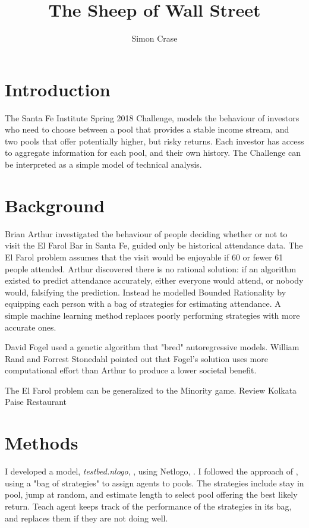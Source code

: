 \documentclass[]{article}
\title{The Sheep of Wall Street}
\author{Simon Crase}
\begin{document}
\maketitle

\begin{abstract}

\end{abstract}

\section{Introduction}
The Santa Fe Institute Spring 2018 Challenge\cite{Challenge:2018}, models the behaviour of investors who need to choose between a pool that provides a stable income stream, and two pools that offer potentially higher, but risky returns. Each investor has access to aggregate information for each pool, and their own history. The Challenge can be interpreted as a simple model of technical analysis\cite{wiki:technical}.

\section{Background}
Brian Arthur \cite{arthur1994inductive} investigated the behaviour of people deciding whether or not to visit the El Farol Bar in Santa Fe, guided only be historical attendance data. The El Farol problem assumes that the visit would be enjoyable if 60 or fewer 61 people attended. Arthur discovered there is no rational solution: if an algorithm existed to predict attendance accurately, either everyone would attend, or nobody would, falsifying the prediction. Instead he modelled Bounded Rationality by equipping each person with a bag of strategies for estimating attendance. A simple machine learning method replaces poorly performing strategies with more accurate ones.


David Fogel \cite{fogel1999inductive} used a genetic algorithm that "bred" autoregressive models. William Rand and Forrest Stonedahl\cite{rand2007farol} pointed out that Fogel's solution uses more computational effort than Arthur to produce a lower societal benefit.

The El Farol problem can be generalized to the Minority game. Review \cite{szabo2007evolutionary} Kolkata Paise Restaurant \cite{chakrabarti2007kolkata}
\cite{chakrabarti2009kolkata}

\section{Methods}
I developed a model, \emph{testbed.nlogo}, \cite{Github:2018}, using Netlogo, \cite{Wilensky:1999}. I followed the approach of \cite{arthur1994inductive}, using a "bag of strategies" to assign agents to pools. The strategies include stay in pool, jump at random, and estimate length to select pool offering the best likely return. Teach agent keeps track of the performance of the strategies in its bag, and replaces them if they are not doing well.
\end{document}
